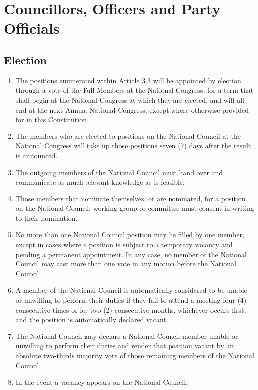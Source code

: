 \documentclass[a4paper,titlepage,8.5pt]{article}
\begin{document}
\section{Councillors, Officers and Party Officials}

\subsection{Election}

\begin{enumerate}
\item The positions enumerated within Article 3.3 will be appointed by election through a vote of the Full Members at the National Congress, for a term that shall begin at the National Congress at which they are elected, and will all end at the next Annual National Congress, except where otherwise provided for in this Constitution.
\item The members who are elected to positions on the National Council at the National Congress will take up those positions seven (7) days after the result is announced.
\item The outgoing members of the National Council must hand over and communicate as much relevant knowledge as is feasible.
\item Those members that nominate themselves, or are nominated, for a position on the National Council, working group or committee must consent in writing to their nomination.
\item No more than one National Council position may be filled by one member, except in cases where a position is subject to a temporary vacancy and pending a permanent appointment. In any case, no member of the National Council may cast more than one vote in any motion before the National Council.
\item A member of the National Council is automatically considered to be unable or unwilling to perform their duties if they fail to attend a meeting four (4) consecutive times or for two (2) consecutive months, whichever occurs first, and the position is automatically declared vacant.
\item The National Council may declare a National Council member unable or unwilling to perform their duties and render that position vacant by an absolute two-thirds majority vote of those remaining members of the National Council.
\item In the event a vacancy appears on the National Council:
\begin{enumerate}

\end{enumerate}
\end{enumerate}
\end{document}
